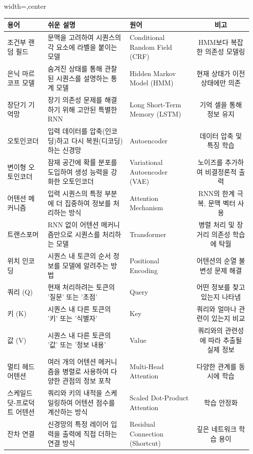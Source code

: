 \documentclass[11pt,a4paper]{article}
\begin{document}
\begin{adjustbox}{width=\textwidth,center}
\begin{tabular}{lllc}
\toprule
\textbf{용어} & \textbf{쉬운 설명} & \textbf{원어} & \textbf{비고} \\
\midrule
조건부 랜덤 필드 & 문맥을 고려하여 시퀀스의 각 요소에 라벨을 붙이는 모델 & Conditional Random Field (CRF) & HMM보다 복잡한 의존성 모델링 \\
은닉 마르코프 모델 & 숨겨진 상태를 통해 관찰된 시퀀스를 설명하는 통계 모델 & Hidden Markov Model (HMM) & 현재 상태가 이전 상태에만 의존 \\
장단기 기억망 & 장기 의존성 문제를 해결하기 위해 고안된 특별한 RNN & Long Short-Term Memory (LSTM) & 기억 셀을 통해 정보 유지 \\
오토인코더 & 입력 데이터를 압축(인코딩)하고 다시 복원(디코딩)하는 신경망 & Autoencoder & 데이터 압축 및 특징 학습 \\
변이형 오토인코더 & 잠재 공간에 확률 분포를 도입하여 생성 능력을 강화한 오토인코더 & Variational Autoencoder (VAE) & 노이즈를 추가하여 비결정론적 출력 \\
어텐션 메커니즘 & 입력 시퀀스의 특정 부분에 더 집중하여 정보를 처리하는 방식 & Attention Mechanism & RNN의 한계 극복, 문맥 벡터 사용 \\
트랜스포머 & RNN 없이 어텐션 메커니즘만으로 시퀀스를 처리하는 모델 & Transformer & 병렬 처리 및 장거리 의존성 학습에 탁월 \\
위치 인코딩 & 시퀀스 내 토큰의 순서 정보를 모델에 알려주는 방법 & Positional Encoding & 어텐션의 순열 불변성 문제 해결 \\
쿼리 (Q) & 현재 처리하려는 토큰의 '질문' 또는 '초점' & Query & 어떤 정보를 찾고 있는지 나타냄 \\
키 (K) & 시퀀스 내 다른 토큰의 '키' 또는 '식별자' & Key & 쿼리와 얼마나 관련이 있는지 비교 \\
값 (V) & 시퀀스 내 다른 토큰의 '값' 또는 '정보 내용' & Value & 쿼리와의 관련성에 따라 추출될 실제 정보 \\
멀티 헤드 어텐션 & 여러 개의 어텐션 메커니즘을 병렬로 사용하여 다양한 관점의 정보 포착 & Multi-Head Attention & 다양한 관계를 동시에 학습 \\
스케일드 닷-프로덕트 어텐션 & 쿼리와 키의 내적을 스케일링하여 어텐션 점수를 계산하는 방식 & Scaled Dot-Product Attention & 학습 안정화 \\
잔차 연결 & 신경망의 특정 레이어 입력을 출력에 직접 더하는 연결 방식 & Residual Connection (Shortcut) & 깊은 네트워크 학습 용이 \\

\end{tabular}
\end{adjustbox}
\end{document}
